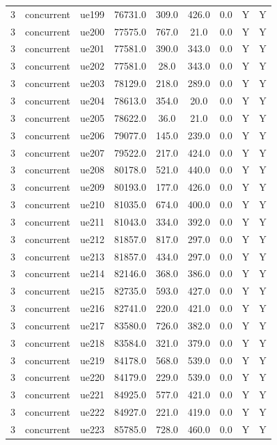 \begin{table}[ht]
\begin{tabular}{|c|c|c|c|c|c|c|c|c|}
3 & concurrent & ue199 & 76731.0 & 309.0 & 426.0 & 0.0 & Y & Y \\
3 & concurrent & ue200 & 77575.0 & 767.0 & 21.0 & 0.0 & Y & Y \\
3 & concurrent & ue201 & 77581.0 & 390.0 & 343.0 & 0.0 & Y & Y \\
3 & concurrent & ue202 & 77581.0 & 28.0 & 343.0 & 0.0 & Y & Y \\
3 & concurrent & ue203 & 78129.0 & 218.0 & 289.0 & 0.0 & Y & Y \\
3 & concurrent & ue204 & 78613.0 & 354.0 & 20.0 & 0.0 & Y & Y \\
3 & concurrent & ue205 & 78622.0 & 36.0 & 21.0 & 0.0 & Y & Y \\
3 & concurrent & ue206 & 79077.0 & 145.0 & 239.0 & 0.0 & Y & Y \\
3 & concurrent & ue207 & 79522.0 & 217.0 & 424.0 & 0.0 & Y & Y \\
3 & concurrent & ue208 & 80178.0 & 521.0 & 440.0 & 0.0 & Y & Y \\
3 & concurrent & ue209 & 80193.0 & 177.0 & 426.0 & 0.0 & Y & Y \\
3 & concurrent & ue210 & 81035.0 & 674.0 & 400.0 & 0.0 & Y & Y \\
3 & concurrent & ue211 & 81043.0 & 334.0 & 392.0 & 0.0 & Y & Y \\
3 & concurrent & ue212 & 81857.0 & 817.0 & 297.0 & 0.0 & Y & Y \\
3 & concurrent & ue213 & 81857.0 & 434.0 & 297.0 & 0.0 & Y & Y \\
3 & concurrent & ue214 & 82146.0 & 368.0 & 386.0 & 0.0 & Y & Y \\
3 & concurrent & ue215 & 82735.0 & 593.0 & 427.0 & 0.0 & Y & Y \\
3 & concurrent & ue216 & 82741.0 & 220.0 & 421.0 & 0.0 & Y & Y \\
3 & concurrent & ue217 & 83580.0 & 726.0 & 382.0 & 0.0 & Y & Y \\
3 & concurrent & ue218 & 83584.0 & 321.0 & 379.0 & 0.0 & Y & Y \\
3 & concurrent & ue219 & 84178.0 & 568.0 & 539.0 & 0.0 & Y & Y \\
3 & concurrent & ue220 & 84179.0 & 229.0 & 539.0 & 0.0 & Y & Y \\
3 & concurrent & ue221 & 84925.0 & 577.0 & 421.0 & 0.0 & Y & Y \\
3 & concurrent & ue222 & 84927.0 & 221.0 & 419.0 & 0.0 & Y & Y \\
3 & concurrent & ue223 & 85785.0 & 728.0 & 460.0 & 0.0 & Y & Y \\

\end{tabular}
\end{table}
